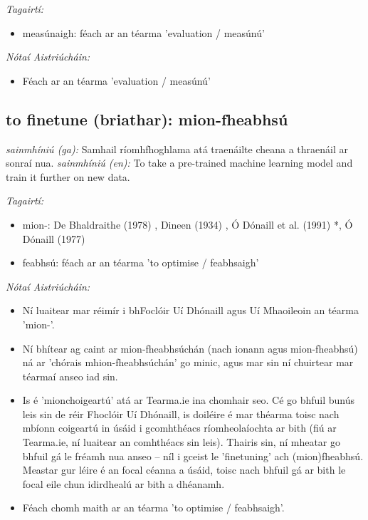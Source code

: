 \documentclass{article}
\begin{document}
 \noindent \textit{Tagairtí:}
\begin{itemize}
	\item measúnaigh: féach ar an téarma 'evaluation / measúnú'
\end{itemize}

 \noindent \textit{Nótaí Aistriúcháin:}
\begin{itemize}
	\item Féach ar an téarma 'evaluation / measúnú'
\end{itemize}


\subsection*{to finetune (briathar): mion-fheabhsú} 
 \noindent \textit{sainmhíniú (ga):} Samhail ríomhfhoghlama atá traenáilte cheana a thraenáil ar sonraí nua.
\newline\newline
 \noindent \textit{sainmhíniú (en):} To take a pre-trained machine learning model and train it further on new data.
\newline

 \noindent \textit{Tagairtí:}
\begin{itemize}
	\item mion-: De Bhaldraithe (1978) \cite{de-bhaldraithe}, Dineen (1934) \cite{dineen}, Ó Dónaill et al. (1991) \cite{focloir-beag}*, Ó Dónaill (1977) \cite{odonaill}
	\item feabhsú: féach ar an téarma 'to optimise / feabhsaigh'
\end{itemize}

 \noindent \textit{Nótaí Aistriúcháin:}
\begin{itemize}
	\item Ní luaitear mar réimír i bhFoclóir Uí Dhónaill agus Uí Mhaoileoin an téarma 'mion-'.
	\item Ní bhítear ag caint ar mion-fheabhsúchán (nach ionann agus mion-fheabhsú) ná ar 'chórais mhion-fheabhsúchán' go minic, agus mar sin ní chuirtear mar téarmaí anseo iad sin.
	\item Is é 'mionchoigeartú' atá ar Tearma.ie ina chomhair seo. Cé go bhfuil bunús leis sin de réir Fhoclóir Uí Dhónaill, is doiléire é mar théarma toisc nach mbíonn coigeartú in úsáid i gcomhthéacs ríomheolaíochta ar bith (fiú ar Tearma.ie, ní luaitear an comhthéacs sin leis). Thairis sin, ní mheatar go bhfuil gá le fréamh nua anseo -- níl i gceist le 'finetuning' ach (mion)fheabhsú. Meastar gur léire é an focal céanna a úsáid, toisc nach bhfuil gá ar bith le focal eile chun idirdhealú ar bith a dhéanamh.
	\item Féach chomh maith ar an téarma 'to optimise / feabhsaigh'.
\end{itemize}
\end{document}
